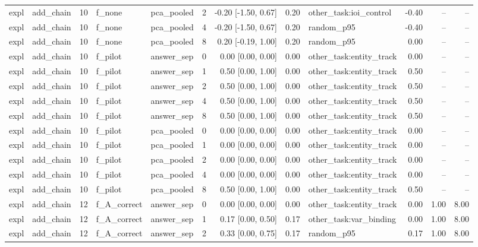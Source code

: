 \begin{tabular}{llrllrrrlrrr}
expl & add\_chain & 10 & f\_none & pca\_pooled & 2 & -0.20 [-1.50, 0.67] & 0.20 & other\_task:ioi\_control & -0.40 & -- & -- \\
expl & add\_chain & 10 & f\_none & pca\_pooled & 4 & -0.20 [-1.50, 0.67] & 0.20 & random\_p95 & -0.40 & -- & -- \\
expl & add\_chain & 10 & f\_none & pca\_pooled & 8 & 0.20 [-0.19, 1.00] & 0.20 & random\_p95 & 0.00 & -- & -- \\
expl & add\_chain & 10 & f\_pilot & answer\_sep & 0 & 0.00 [0.00, 0.00] & 0.00 & other\_task:entity\_track & 0.00 & -- & -- \\
expl & add\_chain & 10 & f\_pilot & answer\_sep & 1 & 0.50 [0.00, 1.00] & 0.00 & other\_task:entity\_track & 0.50 & -- & -- \\
expl & add\_chain & 10 & f\_pilot & answer\_sep & 2 & 0.50 [0.00, 1.00] & 0.00 & other\_task:entity\_track & 0.50 & -- & -- \\
expl & add\_chain & 10 & f\_pilot & answer\_sep & 4 & 0.50 [0.00, 1.00] & 0.00 & other\_task:entity\_track & 0.50 & -- & -- \\
expl & add\_chain & 10 & f\_pilot & answer\_sep & 8 & 0.50 [0.00, 1.00] & 0.00 & other\_task:entity\_track & 0.50 & -- & -- \\
expl & add\_chain & 10 & f\_pilot & pca\_pooled & 0 & 0.00 [0.00, 0.00] & 0.00 & other\_task:entity\_track & 0.00 & -- & -- \\
expl & add\_chain & 10 & f\_pilot & pca\_pooled & 1 & 0.00 [0.00, 0.00] & 0.00 & other\_task:entity\_track & 0.00 & -- & -- \\
expl & add\_chain & 10 & f\_pilot & pca\_pooled & 2 & 0.00 [0.00, 0.00] & 0.00 & other\_task:entity\_track & 0.00 & -- & -- \\
expl & add\_chain & 10 & f\_pilot & pca\_pooled & 4 & 0.00 [0.00, 0.00] & 0.00 & other\_task:entity\_track & 0.00 & -- & -- \\
expl & add\_chain & 10 & f\_pilot & pca\_pooled & 8 & 0.50 [0.00, 1.00] & 0.00 & other\_task:entity\_track & 0.50 & -- & -- \\
expl & add\_chain & 12 & f\_A\_correct & answer\_sep & 0 & 0.00 [0.00, 0.00] & 0.00 & other\_task:entity\_track & 0.00 & 1.00 & 8.00 \\
expl & add\_chain & 12 & f\_A\_correct & answer\_sep & 1 & 0.17 [0.00, 0.50] & 0.17 & other\_task:var\_binding & 0.00 & 1.00 & 8.00 \\
expl & add\_chain & 12 & f\_A\_correct & answer\_sep & 2 & 0.33 [0.00, 0.75] & 0.17 & random\_p95 & 0.17 & 1.00 & 8.00 \\

\end{tabular}
